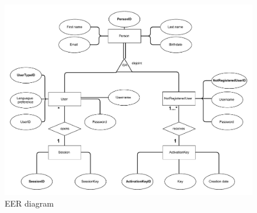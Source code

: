 \begin{figure}[H]
	\centering
	\includegraphics[scale=0.5]{design/EERIT1.pdf}
	\caption{EER diagram}
	\label{fig:EER diagram}
\end{figure}